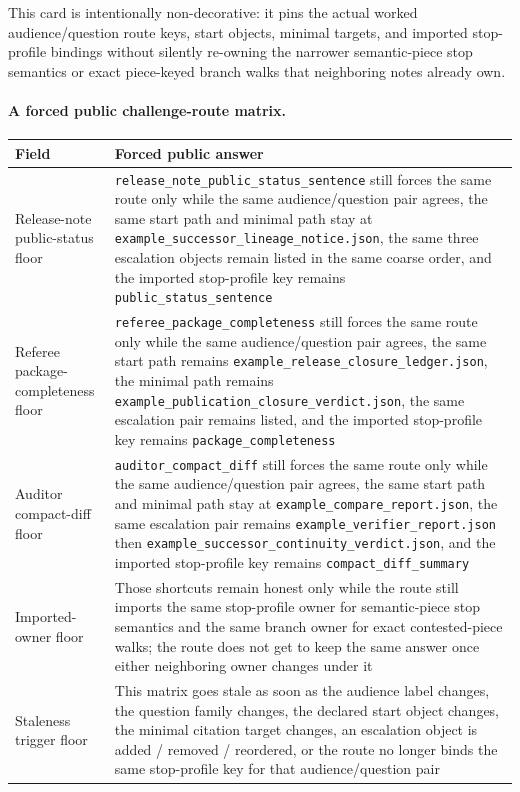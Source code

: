\documentclass[11pt]{article}
\begin{document}
This card is intentionally non-decorative: it pins the actual worked audience/question route keys, start objects, minimal targets, and imported stop-profile bindings without silently re-owning the narrower semantic-piece stop semantics or exact piece-keyed branch walks that neighboring notes already own.\cite{series:workedexample}

\paragraph{A forced public challenge-route matrix.}
\begin{table}[t]
\centering
\small
\begin{tabularx}{\linewidth}{@{}lX@{}}
\toprule
Field & Forced public answer \\
\midrule
Release-note public-status floor & \nolinkurl{release_note_public_status_sentence} still forces the same route only while the same audience/question pair agrees, the same start path and minimal path stay at \nolinkurl{example_successor_lineage_notice.json}, the same three escalation objects remain listed in the same coarse order, and the imported stop-profile key remains \nolinkurl{public_status_sentence} \\
Referee package-completeness floor & \nolinkurl{referee_package_completeness} still forces the same route only while the same audience/question pair agrees, the same start path remains \nolinkurl{example_release_closure_ledger.json}, the minimal path remains \nolinkurl{example_publication_closure_verdict.json}, the same escalation pair remains listed, and the imported stop-profile key remains \nolinkurl{package_completeness} \\
Auditor compact-diff floor & \nolinkurl{auditor_compact_diff} still forces the same route only while the same audience/question pair agrees, the same start path and minimal path stay at \nolinkurl{example_compare_report.json}, the same escalation pair remains \nolinkurl{example_verifier_report.json} then \nolinkurl{example_successor_continuity_verdict.json}, and the imported stop-profile key remains \nolinkurl{compact_diff_summary} \\
Imported-owner floor & Those shortcuts remain honest only while the route still imports the same stop-profile owner for semantic-piece stop semantics and the same branch owner for exact contested-piece walks; the route does not get to keep the same answer once either neighboring owner changes under it \\
Staleness trigger floor & This matrix goes stale as soon as the audience label changes, the question family changes, the declared start object changes, the minimal citation target changes, an escalation object is added / removed / reordered, or the route no longer binds the same stop-profile key for that audience/question pair \\

\end{tabularx}
\end{table}
\end{document}
